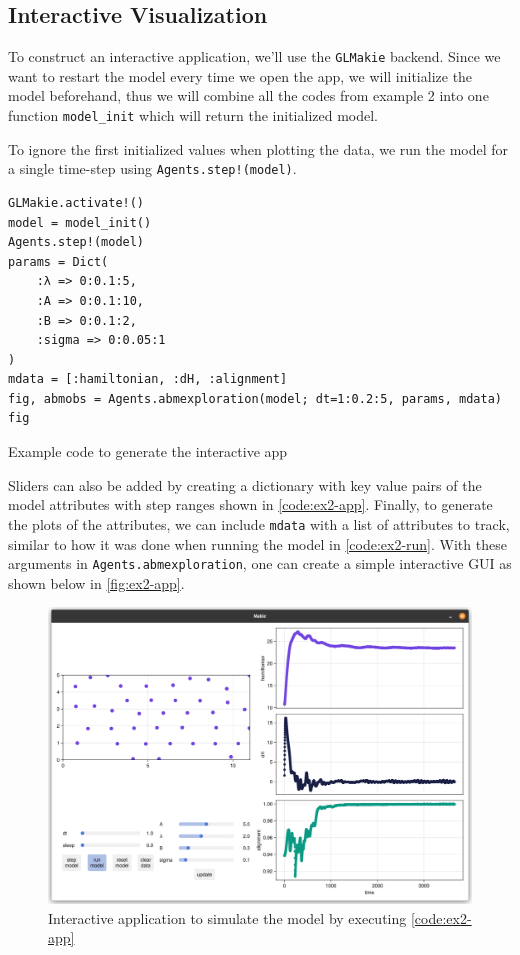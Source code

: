 \subsection{Interactive Visualization}
To construct an interactive application, we'll use the \texttt{GLMakie} backend. Since we want to restart the model every time we open the app, we will initialize the model beforehand, thus we will combine all the codes from example 2 into one function \texttt{model\_init} which will return the initialized model.

To ignore the first initialized values when plotting the data, we run the model for a single time-step using \texttt{Agents.step!(model)}. 
\begin{listing}[H]
\begin{verbatim}
GLMakie.activate!()
model = model_init()
Agents.step!(model)
params = Dict(
    :λ => 0:0.1:5,
    :A => 0:0.1:10,
    :B => 0:0.1:2,
    :sigma => 0:0.05:1
)
mdata = [:hamiltonian, :dH, :alignment]
fig, abmobs = Agents.abmexploration(model; dt=1:0.2:5, params, mdata)
fig
\end{verbatim}
\caption{Example code to generate the interactive app}
\label{code:ex2-app}
\end{listing}

Sliders can also be added by creating a dictionary with key value pairs of the model attributes with step ranges shown in \autoref{code:ex2-app}. Finally, to generate the plots of the attributes, we can include \texttt{mdata} with a list of attributes to track, similar to how it was done when running the model in \autoref{code:ex2-run}. With these arguments in \texttt{Agents.abmexploration}, one can create a simple interactive GUI as shown below in \autoref{fig:ex2-app}.

\begin{figure}[H]
    \centering
    \includegraphics[width=\textwidth]{figures/ch6_tutorial/example_app1.png}
    \caption{Interactive application to simulate the model by executing \autoref{code:ex2-app}}
    \label{fig:ex2-app}
\end{figure}

